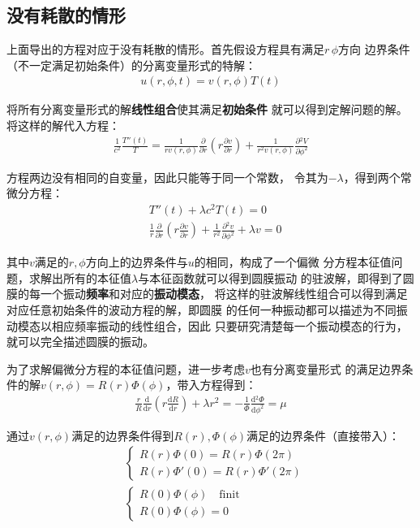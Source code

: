 \documentclass[a4paper]{ctexart}
\def\d{\mathrm{d}}
\newcommand{\mr}[1]{\mathrm{#1}}
\newcommand{\dv}[2]{\frac{\d{#1}}{\d{#2}}}
\newcommand{\pdv}[2]{\frac{\partial{#1}}{\partial{#2}}}
\begin{document}
	\subsection{没有耗散的情形}
	上面导出的方程对应于没有耗散的情形。首先假设方程具有满足$r\, \phi$方向
	边界条件（不一定满足初始条件）的分离变量形式的特解：
	\begin{align}
		u(r, \phi, t) = v(r, \phi)T(t)
	\end{align}
	\par 将所有分离变量形式的解\textbf{线性组合}使其满足\textbf{初始条件}
	就可以得到定解问题的解。将这样的解代入方程：
	\begin{align}
		\frac{1}{c^2}\frac{T''(t)}{T} = \frac{1}{rv(r,\phi)}\pdv{}{r}\left(r\pdv{v}{r}\right)
		 + \frac{1}{r^2 v(r,\phi)}\pdv{^2 V}{\phi^2}
	\end{align}
	\par 方程两边没有相同的自变量，因此只能等于同一个常数，
	令其为$-\lambda$，得到两个常微分方程：
	\begin{align}
		&T{''}(t) + \lambda c^2T(t) = 0\\
		&\frac{1}{r}\pdv{}{r}\left(r\pdv{v}{r}\right) + \frac{1}{r^2}\pdv{^2 v}{\phi^2} + \lambda v = 0
	\end{align}
	\par 其中$v$满足的$r, \phi$方向上的边界条件与$u$的相同，构成了一个偏微
	分方程本征值问题，求解出所有的本征值$\lambda$与本征函数就可以得到圆膜振动
	的驻波解，即得到了圆膜的每一个振动\textbf{频率}和对应的\textbf{振动模态}，
	将这样的驻波解线性组合可以得到满足对应任意初始条件的波动方程的解，即圆膜
	的任何一种振动都可以描述为不同振动模态以相应频率振动的线性组合，因此
	只要研究清楚每一个振动模态的行为，就可以完全描述圆膜的振动。
	\par 为了求解偏微分方程的本征值问题，进一步考虑$v$也有分离变量形式
	的满足边界条件的解$v(r, \phi) = R(r)\Phi(\phi)$，带入方程得到：
	\begin{align}
		\frac{r}{R}\dv{}{r}\left(r\dv{R}{r}\right) + \lambda r^{2} = -\frac{1}{\Phi}\dv{^2 \Phi}{\phi^2} = \mu
	\end{align}
	\par 通过$v(r, \phi)$满足的边界条件得到$R(r), \Phi(\phi)$满足的边界条件（直接带入）：
	\begin{align}
		&\left\{
			\begin{array}{lr}
				R(r)\Phi(0) = R(r)\Phi(2\pi)\\
				R(r)\Phi'(0) = R(r)\Phi'(2\pi)
			\end{array}
		\right.\\
		&\left\{ 
			\begin{array}{lr}
				R(0)\Phi(\phi)\quad \mr{finit}\\
				R(0)\Phi(\phi) = 0
			\end{array}
		\right.
	\end{align}
\end{document}
